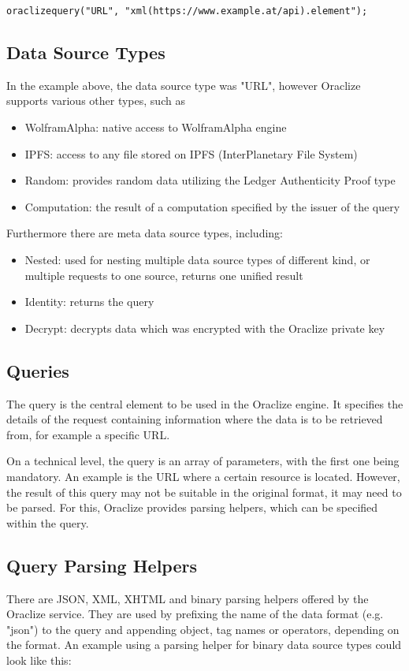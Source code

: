 \texttt{oraclize\textunderscore query("URL", "xml(https://www.example.at/api).element");}
\subsection*{Data Source Types}
In the example above, the data source type was "URL", however Oraclize supports various other types, such as\cite{oraclizedoc}
\begin{itemize}
	\item WolframAlpha: native access to WolframAlpha engine
	\item IPFS: access to any file stored on IPFS (InterPlanetary File System)
	\item Random: provides random data utilizing the Ledger Authenticity Proof type
	\item Computation: the result of a computation specified by the issuer of the query
\end{itemize}
Furthermore there are meta data source types, including:
\begin{itemize}
	\item Nested: used for nesting multiple data source types of different kind, or multiple requests to one source, returns one unified result
	\item Identity: returns the query
	\item Decrypt: decrypts data which was encrypted with the Oraclize private key
\end{itemize}
\subsection*{Queries}
The query is the central element to be used in the Oraclize engine. It specifies the details of the request containing information where the data is to be retrieved from, for example a specific URL.

On a technical level, the query is an array of parameters, with the first one being mandatory. An example is the URL where a certain resource is located. However, the result of this query may not be suitable in the original format, it may need to be parsed. For this, Oraclize provides parsing helpers, which can be specified within the query.
\subsection*{Query Parsing Helpers}
There are JSON, XML, XHTML and binary parsing helpers offered by the Oraclize service. They are used by prefixing the name of the data format (e.g. "json") to the query and appending object, tag names or operators, depending on the format. An example using a parsing helper for binary data source types could look like this: 

